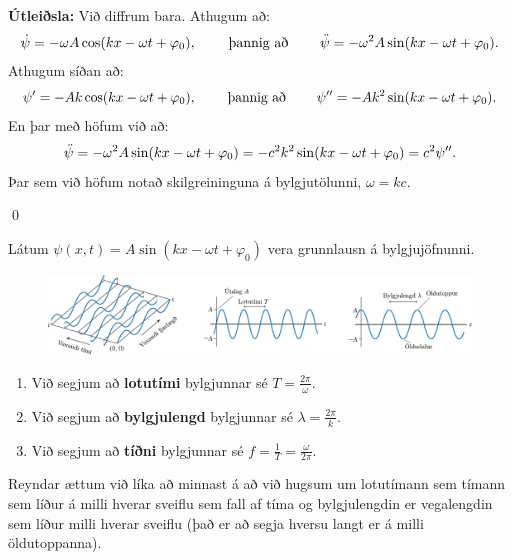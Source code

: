 \textbf{Útleiðsla:} Við diffrum bara. Athugum að:
\begin{align*}
    \dot{\psi} = -\omega A \cos(kx - \omega t + \varphi_0), \hspace{0.8cm} \text{þannig að} \hspace{0.8cm} \Ddot{\psi} = -\omega^2 A \sin(kx - \omega t + \varphi_0).
\end{align*}
Athugum síðan að:
\begin{align*}
    \psi' = -Ak \cos(kx - \omega t + \varphi_0), \hspace{0.8cm} \text{þannig að} \hspace{0.8cm} \psi'' = -Ak^2 \sin(kx - \omega t + \varphi_0).
\end{align*}
En þar með höfum við að:
\begin{align*}
    \Ddot{\psi} = -\omega^2 A\sin(kx-\omega t + \varphi_0) = -c^2k^2 \sin(kx - \omega t + \varphi_0) = c^2 \psi''.
\end{align*}
Þar sem við höfum notað skilgreininguna á bylgjutölunni, $\omega = kc$.

\qed

\begin{tcolorbox}
\begin{definition}
Látum $\psi(x,t) = A\sin(kx - \omega t + \varphi_0)$ vera grunnlausn á bylgjujöfnunni.
\begin{figure}[H]
    \centering
    \includegraphics[scale = 0.8]{figures/waves.pdf}
\end{figure}
\begin{enumerate}[label = \textbf{(\roman*)}]
    \item Við segjum að \textbf{lotutími} bylgjunnar sé $T = \frac{2\pi}{\omega}$.
    \item Við segjum að \textbf{bylgjulengd} bylgjunnar sé $\lambda = \frac{2\pi}{k}$.
    \item Við segjum að \textbf{tíðni} bylgjunnar sé $f = \frac{1}{T} = \frac{\omega}{2\pi}$.
\end{enumerate}
\end{definition}
\end{tcolorbox}

Reyndar ættum við líka að minnast á að við hugsum um lotutímann sem tímann sem líður á milli hverar sveiflu sem fall af tíma og bylgjulengdin er vegalengdin sem líður milli hverar sveiflu (það er að segja hversu langt er á milli öldutoppanna).

